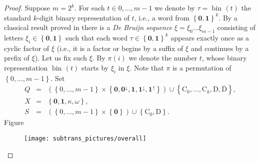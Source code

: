 \documentclass{ws-ijmpc}
\DeclareMathOperator{\bin}{bin\!}
\begin{document}
\begin{proof}
Suppose $m=2^{k}$. For each $t\in0,\dots,m-1$ we denote by $\tau=\bin\left(t\right)$
the standard $k$-digit binary representation of $t$, i.e., a word
from $\left\{ \mathbf{0},\mathbf{1}\right\} ^{k}$. By a classical
result proved in \citep{stm1} there is a \emph{De Bruijn sequence}
$\xi=\xi_{0}\dots\xi_{m-1}$ consisting of letters $\xi_{i}\in\left\{ \mathbf{0},\mathbf{1}\right\} $
such that each word $\tau\in\left\{ \mathbf{0},\mathbf{1}\right\} ^{k}$
appears exactly once as a cyclic factor of $\xi$ (i.e., it is a factor
or begins by a suffix of $\xi$ and continues by a prefix of $\xi$).
Let us fix such $\xi$. By $\pi\!\left(i\right)$ we denote the number
$t$, whose binary representation $\bin\left(t\right)$ starts by
$\xi_{i}$ in $\xi$. Note that $\pi$ is a permutation of $\left\{ 0,\dots,m-1\right\} $.
Set
\begin{eqnarray*}
Q & = & \left(\left\{ 0,\dots,m-1\right\} \times\left\{ \mathbf{0},\mathbf{0^{\downarrow}},\mathbf{1},\mathbf{1^{\downarrow}},\mathbf{1^{\uparrow}}\right\} \right)\cup\left\{ \mathrm{C}_{0},\dots,\mathrm{C}_{k},\mathrm{D},\overline{\mathrm{D}}\right\} ,\\
X & = & \left\{ \mathbf{0},\mathbf{1},\kappa,\omega\right\} ,\\
S & = & \left(\left\{ 0,\dots,m-1\right\} \times\left\{ \mathbf{0}\right\} \right)\cup\left\{ \mathrm{C}_{0},\mathrm{D}\right\} .
\end{eqnarray*}
Figure 
\begin{figure}
\begin{centering}
\texttt{[image: subtrans\_pictures/overall]}
\par\end{centering}


\end{figure}
\end{proof}
\end{document}
